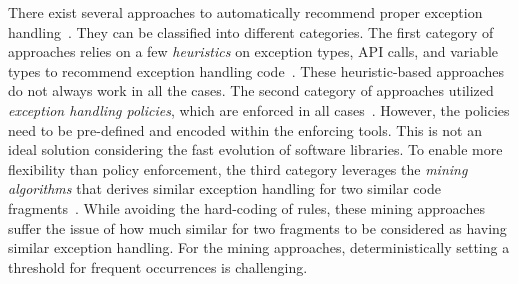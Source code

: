 There exist several approaches to automatically recommend proper
exception
handling~\cite{barbosa-bsse12,chanchal-scam14,barbosa-tse18,barbosa-tse16,xrank-fse20,throw-ase22}. They
can be classified into different categories. The first category of
approaches relies on a few {\em heuristics} on exception types, API
calls, and variable types to recommend exception handling
code~\cite{barbosa-bsse12}. These heuristic-based approaches do not
always work in all the cases. The second category of approaches
utilized {\em exception handling policies}, which are enforced in all
cases~\cite{barbosa-tse16,barbosa-saner18}. However, the policies need
to be pre-defined and encoded within the enforcing tools.  This is not
an ideal solution considering the fast evolution of software
libraries. To enable more flexibility than policy enforcement, the
third category leverages the {\em mining algorithms} that derives
similar exception handling for two similar code
fragments~\cite{chanchal-scam14}. While avoiding the hard-coding of
rules, these mining approaches suffer the issue of how much similar
for two fragments to be considered as having similar exception
handling. For the mining approaches, deterministically setting a
threshold for frequent occurrences is challenging.

